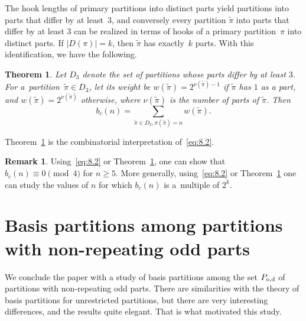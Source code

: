 \documentclass[10pt,a4paper]{amsart}
\numberwithin{equation}{section}
\newtheorem{Theorem}{Theorem}[section]
\theoremstyle{definition}
\newtheorem*{Remark*}{Remark}
\begin{document}
The hook lengths of primary partitions into distinct parts yield partitions
into parts that differ by at least~3, and conversely every partition
$\tilde\pi$ into parts that differ by at least 3 can be realized in terms of
hooks of a primary partition~$\pi$ into distinct parts. If $|D(\pi)|=k$,
then $\tilde\pi$ has exactly~$k$ parts. With this identification, we have the following.

\begin{Theorem}\label{thm:8}
Let $D_3$ denote the set of partitions whose
parts differ by at least $3$. For a~partition~$\tilde\pi\in D_3$, let
its weight be $w(\tilde\pi)=2^{\nu(\tilde\pi) -1}$
if $\tilde\pi$ has $1$ as a part, and
${w(\tilde\pi)=2^{\nu(\tilde\pi)}}$ otherwise, where $\nu(\tilde\pi)$
{{is the number of parts of}} $\tilde\pi$. Then
\[
b_c(n)=\sum_{\tilde\pi\in D_3, \sigma(\tilde\pi)=n}w(\tilde\pi).
\]
\end{Theorem}

Theorem~\ref{thm:8} is the combinatorial interpretation of~\eqref{eq:8.2}.

\begin{Remark*}
Using~\eqref{eq:8.2} or Theorem~\ref{thm:8}, one can show that
$b_c(n)\equiv 0 \pmod 4$ for $n\ge 5$.
More generally, using~\eqref{eq:8.2} or Theorem~\ref{thm:8} one can study the values of $n$ for
which $b_c(n)$ is a~multiple of $2^k$.
\end{Remark*}

\section[Basis partitions among partitions with non-repeating odd parts]{Basis partitions among partitions\\ with non-repeating odd parts}\label{section9}


We conclude the paper with a study of basis partitions among the set $P_{\rm o,d}$
of partitions with non-repeating odd parts. There are similarities with the
theory of basis partitions for unrestricted partitions, but there are very
interesting differences, and the results quite elegant. That is what motivated
this study.
\end{document}
